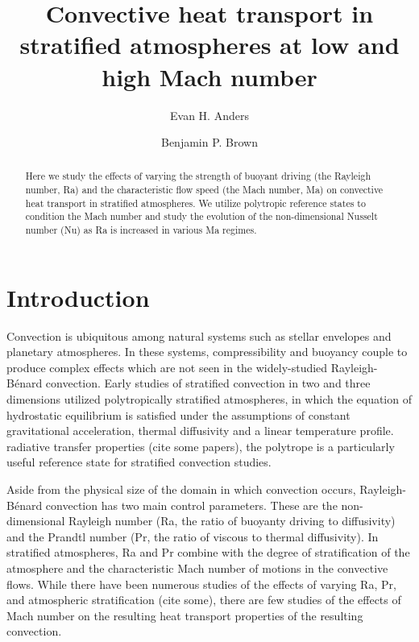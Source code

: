 \documentclass[aps, prl, twocolumn, groupedaddress]{revtex4-1}
\newcommand{\RB}{Rayleigh-B\'{e}nard }
\begin{document}
\author{Evan H. Anders}
\author{Benjamin P. Brown}
\title{Convective heat transport in stratified atmospheres at low and high Mach number}

\begin{abstract}
Here we study the effects of varying the strength of buoyant driving (the Rayleigh number, Ra) and the
characteristic flow speed (the Mach number, Ma) on convective heat transport in stratified atmospheres.
We utilize polytropic reference states to condition the Mach number and study the evolution of the
non-dimensional Nusselt number (Nu) as Ra is increased in various Ma regimes.
\end{abstract}
\maketitle


\section{Introduction \label{section:intro}}
Convection is ubiquitous among natural systems such as stellar envelopes and planetary atmospheres.
In these systems, compressibility and buoyancy couple to produce complex effects which are not seen in
the widely-studied \RB convection.
Early studies of stratified
convection in two \cite{graham1975, chan&all1982, hurlburt&all1984, cattaneo&all1990} and three 
\cite{malagoli&all1990, cattaneo&all1991, brummell&all1996} dimensions
utilized polytropically stratified atmospheres, in which the equation of hydrostatic equilibrium is satisfied
under the assumptions of constant gravitational acceleration, thermal diffusivity and a linear temperature profile.
radiative transfer properties (cite some papers), the polytrope is a particularly useful reference state for
stratified convection studies.

Aside from the physical size of the domain in which convection occurs, \RB convection has two main control
parameters.  These are the non-dimensional Rayleigh number (Ra, the ratio of buoyanty driving to diffusivity)
and the Prandtl number (Pr, the ratio of viscous to thermal diffusivity).  In stratified atmospheres, Ra
and Pr combine with the degree of stratification of the atmosphere and the characteristic Mach number of
motions in the convective flows.  While there have been numerous studies of the effects of varying
Ra, Pr, and atmospheric stratification (cite some), there are few studies of the effects of Mach number
on the resulting heat transport properties of the resulting convection.
\end{document}
